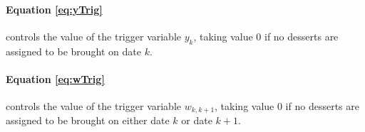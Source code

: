 \documentclass[11pt,letterpaper]{article}
\begin{document}
\paragraph{Equation \eqref{eq:yTrig}} controls the value of the trigger variable $y_k$, taking value 0 if no desserts are assigned to be brought on date $k$.

\paragraph{Equation \eqref{eq:wTrig}} controls the value of the trigger variable $w_{k,k+1}$, taking value 0 if no desserts are assigned to be brought on either date $k$ or date $k+1$.
\end{document}
